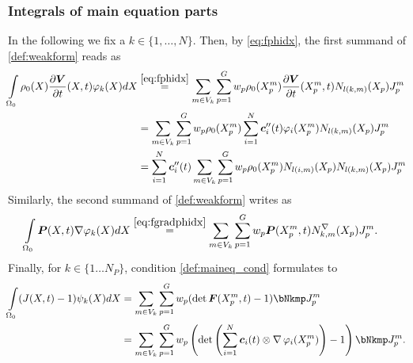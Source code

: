 \subsubsection{Integrals of main equation parts}
In the following we fix a $k\in\{1,\ldots, N\}$.
Then, by \eqref{eq:fphidx}, the first summand of \eqref{def:weakform} reads as
\begin{align}
	\intor \rho_0(X)\d{\vV}{t}(X,t)\varphi_k(X)dX\nonumber
		&\re{eq:fphidx} \sumvk\sumgp w_p \rho_0(\pmp)\d{\vV}{t}(\pmp,t)\Nkmp\jmp\nonumber\\
		&= \sumvk\sumgp w_p \rho_0(\pmp)\sumi \vc_i''(t)\varphi_i(\pmp) \Nkmp\jmp\nonumber\\
		&= \sumi \vc_i''(t)\sumvk\sumgp w_p \rho_0(\pmp)N_{l(i,m)}(X_p) \Nkmp\jmp\label{def:discreteVphidX}
\end{align}
Similarly, the second summand of \eqref{def:weakform} writes as
\begin{align}
		\intor\vP(X,t)\dpk dX &\re{eq:fgradphidx} \sumvk\sumgp w_p\vP(\pmp,t)\dNkmp\jmp.\label{def:discretePgradphidX}
\end{align}
Finally, for $k\in\{1\ldots N_P\}$, condition \eqref{def:maineq_cond} formulates to
\begin{align}
	\intor (J(X,t)-1)\psi_k(X)dX &= \sumvk\sumgp w_p (\det\vF(\pmp,t)-1) \bNkmp\jmp\label{eq:weak_incomp_condition}\\
	&= \sumvk\sumgp w_p \left(\det\left(\sumi \vc_i(t)\otimes \divergence\varphi_i(\pmp)\right)-1\right) \bNkmp\jmp.\nonumber
\end{align}

